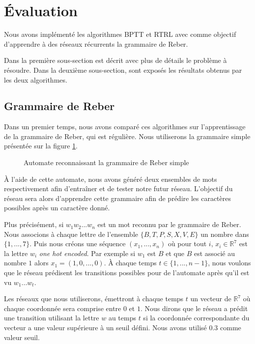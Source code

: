 \section{Évaluation}

Nous avons implémenté les algorithmes BPTT et RTRL avec comme objectif d'apprendre à des réseaux récurrents la grammaire de Reber.

Dans la première sous-section est décrit avec plus de détails le problème à résoudre. Dans la deuxième sous-section, sont exposés les résultats obtenus par les deux algorithmes.

\subsection{Grammaire de Reber}

Dans un premier temps, nous avons comparé ces algorithmes sur l'apprentissage de la grammaire de Reber, qui est régulière. Nous utiliserons la grammaire simple présentée sur la figure \ref{Grammaire de Reber simple}.

\begin{figure}[h!]
\begin{center}

\caption{Automate reconnaissant la grammaire de Reber simple}
\label{Grammaire de Reber simple}
\end{center}
\end{figure}

À l'aide de cette automate, nous avons généré deux ensembles de mots respectivement afin d'entraîner et de tester notre futur réseau. L'objectif du réseau sera alors d'apprendre cette grammaire afin de prédire les caractères possibles après un caractère donné.

Plus précisément, si $w_1w_2...w_n$ est un mot reconnu par le grammaire de Reber. Nous associons à chaque lettre de l'ensemble $\{B, T, P, S, X, V, E\}$ un nombre dans $\{1, ..., 7\}$. Puis nous créons une séquence $(x_1, ..., x_n)$ où pour tout $i$, $x_i \in \mathbb{R}^7$ est la lettre $w_i$ \textit{one hot encoded}. Par exemple si $w_1$ est $B$ et que $B$ est associé au nombre $1$ alors $x_1 = (1, 0, ..., 0)$. À chaque temps $t \in \{1, ..., n-1\}$, nous voulons que le réseau prédisent les transitions possibles pour de l'automate après qu'il est vu $w_1...w_t$.

Les réseaux que nous utiliserons, émettront à chaque temps $t$ un vecteur de $\mathbb{R}^7$ où chaque coordonnée sera comprise entre $0$ et $1$. Nous dirons que le réseau a prédit une transition utilisant la lettre $w$ au temps $t$ si la coordonnée correspondante du vecteur a une valeur supérieure à un seuil défini. Nous avons utilisé $0.3$ comme valeur seuil.

